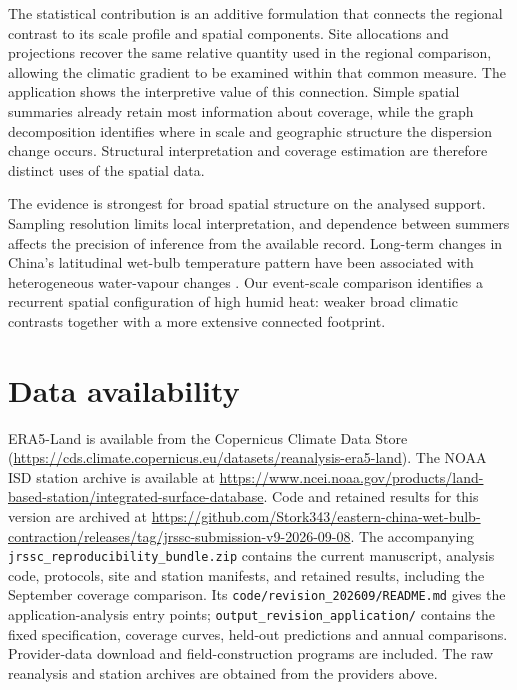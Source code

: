 \documentclass[namedate,webpdf,modern,mediumone]{oup-authoring-template}
\begin{document}
The statistical contribution is an additive formulation that connects the
regional contrast to its scale profile and spatial components. Site
allocations and projections recover the same relative quantity used in the
regional comparison, allowing the climatic gradient to be examined within
that common measure. The application shows the interpretive value of this
connection. Simple spatial summaries already retain most information about
coverage, while the graph decomposition identifies where in scale and
geographic structure the dispersion change occurs. Structural interpretation
and coverage estimation are therefore distinct uses of the spatial data.

The evidence is strongest for broad spatial structure on the analysed
support. Sampling resolution limits local interpretation, and dependence
between summers affects the precision of inference from the available
record. Long-term changes in China's latitudinal wet-bulb temperature
pattern have been associated with heterogeneous water-vapour changes
\citep{wang2024}. Our event-scale comparison identifies a recurrent spatial configuration of
high humid heat: weaker broad climatic contrasts together with a more
extensive connected footprint.

\section*{Data availability}

ERA5-Land is available from the Copernicus Climate Data Store
(\url{https://cds.climate.copernicus.eu/datasets/reanalysis-era5-land}). The
NOAA ISD station archive \citep{smith2011} is available at
\url{https://www.ncei.noaa.gov/products/land-based-station/integrated-surface-database}.
Code and retained results for this version are archived at
\url{https://github.com/Stork343/eastern-china-wet-bulb-contraction/releases/tag/jrssc-submission-v9-2026-09-08}.
The accompanying \texttt{jrssc\_reproducibility\_bundle.zip} contains the
current manuscript, analysis code, protocols, site and station manifests,
and retained results, including the September coverage comparison.
Its \texttt{code/revision\_202609/README.md} gives the application-analysis
entry points; \texttt{output\_revision\_application/} contains the fixed
specification, coverage curves, held-out predictions and annual comparisons.
Provider-data download and field-construction programs are included. The raw
reanalysis and station archives are obtained from the providers above.
\end{document}
